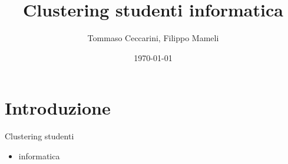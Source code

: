 \documentclass{beamer}
\title{Clustering studenti informatica}
\date{\today}
\author{Tommaso Ceccarini, Filippo Mameli}
\begin{document}
        
    \maketitle

    \section{Introduzione}
    
    \begin{frame}{Clustering}
        studenti 
        \begin{itemize}
            \item informatica
        \end{itemize} 
    \end{frame}
\end{document}
